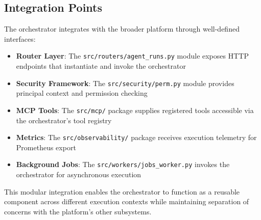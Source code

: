 \subsection{Integration Points}

The orchestrator integrates with the broader platform through well-defined interfaces:

\begin{itemize}
    \item \textbf{Router Layer}: The \texttt{src/routers/agent\_runs.py} module exposes HTTP endpoints that instantiate and invoke the orchestrator
    
    \item \textbf{Security Framework}: The \texttt{src/security/perm.py} module provides principal context and permission checking
    
    \item \textbf{MCP Tools}: The \texttt{src/mcp/} package supplies registered tools accessible via the orchestrator's tool registry
    
    \item \textbf{Metrics}: The \texttt{src/observability/} package receives execution telemetry for Prometheus export
    
    \item \textbf{Background Jobs}: The \texttt{src/workers/jobs\_worker.py} invokes the orchestrator for asynchronous execution
\end{itemize}

This modular integration enables the orchestrator to function as a reusable component across different execution contexts while maintaining separation of concerns with the platform's other subsystems.

